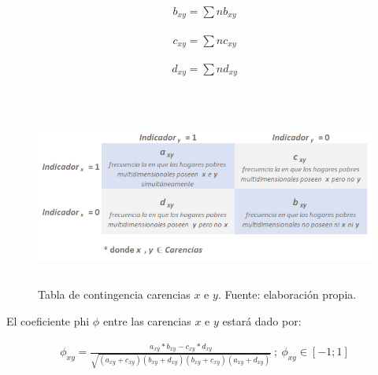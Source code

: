 \documentclass[12pt,letterpaper,spanish]{article}
\begin{document}
\begin{enumerate}
\begin{equation} \label{nb}
\begin{split}
b_{xy}=\sum nb_{xy}
\end{split}
\end{equation}

\begin{equation} \label{nc}
\begin{split}
c_{xy}=\sum nc_{xy}
\end{split}
\end{equation}

\begin{equation} \label{nd}
\begin{split}
d_{xy}=\sum nd_{xy}
\end{split}
\end{equation}\\


\begin{figure}[H]
    \centering
    \includegraphics[height=6cm]{Max/tabla_contingencia2.png}
    \caption{Tabla de contingencia carencias $x$ e $y$. Fuente: elaboración propia.}
    \label{tabla_contingencia}
\end{figure}


El coeficiente phi $\phi$ entre las carencias $x$ e $y$ estará dado por:

\begin{equation} \label{calculophi}
\begin{split}
\phi_{xy}=\frac{a_{xy}*b_{xy}-c_{xy}*d_{xy}}{\sqrt{(a_{xy}+c_{xy})(b_{xy}+d_{xy})(b_{xy}+c_{xy})(a_{xy}+d_{xy})}} \: ;\: \phi_{xy} \in [-1;1]
\end{split}
\end{equation}\\







\end{enumerate}
\end{document}
